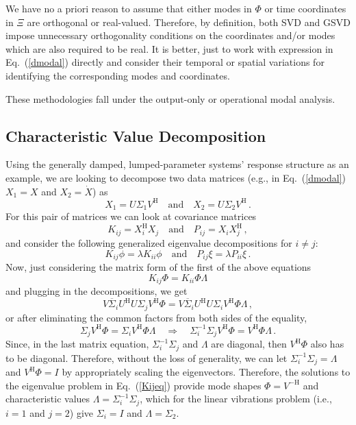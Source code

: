 \documentclass[10pt]{article}
\newcommand{\eq}[1]{Eq.\ (\ref{#1})}
\begin{document}
We have no a priori reason to assume that either modes in $\Phi$ or time coordinates in $\Xi$ are orthogonal or real-valued.
Therefore, by definition, both SVD and GSVD impose unnecessary orthogonality conditions on the coordinates and/or modes which are also required to be real.
It is better, just to work with expression in \eq{dmodal} directly and consider their temporal or spatial variations for identifying the corresponding modes and coordinates.

These methodologies fall under the output-only or operational modal analysis.

\subsection{Characteristic Value Decomposition}

Using the generally damped, lumped-parameter systems' response structure as an example, we are looking to decompose two data matrices (e.g., in \eq{dmodal} $X_1 = X$ and $X_2 = \dot X$) as 
\begin{equation}
	X_1 = U \Sigma_1 V^\mathrm{H} \quad \mathrm{and} \quad X_2 = U \Sigma_2 V^\mathrm{H}\,.
\end{equation}
For this pair of matrices we can look at covariance matrices
\begin{equation}
	K_{ij} = X_i^\mathrm{H}X_j \quad \mathrm{and} \quad P_{ij} = X_i X_j^\mathrm{H}\,,
\end{equation}
and consider the following generalized eigenvalue decompositions for $i\ne j$:
\begin{equation}
	K_{ij} \phi = \lambda K_{ii} \phi \quad \mathrm{and} \quad P_{ij} \xi = \lambda P_{ii} \xi\,.
\end{equation}
Now, just considering the matrix form of the first of the above equations
\begin{equation}\label{Kijeq}
	K_{ij} \Phi = K_{ii} \Phi\Lambda 
\end{equation}
and plugging in the decompositions, we get
\begin{equation}
	V\overline{\Sigma}_i U^\mathrm{H} U \Sigma_j V^\mathrm{H} \Phi = V\overline{\Sigma}_i U^\mathrm{H} U \Sigma_i V^\mathrm{H} \Phi \Lambda\,,
\end{equation}
or after eliminating the common factors from both sides of the equality,
\begin{equation}
	\Sigma_j V^\mathrm{H} \Phi = \Sigma_i V^\mathrm{H} \Phi \Lambda \quad \Rightarrow \quad \Sigma_i^{-1} \Sigma_j V^\mathrm{H} \Phi = V^\mathrm{H}\Phi \Lambda\,.
\end{equation}
Since, in the last matrix equation, $\Sigma_i^{-1} \Sigma_j$ and $\Lambda$ are diagonal, then $V^\mathrm{H} \Phi$ also has to be diagonal.
Therefore, without the loss of generality, we can let $\Sigma_i^{-1} \Sigma_j = \Lambda$ and $V^\mathrm{H} \Phi = I$ by appropriately scaling the eigenvectors.
Therefore, the solutions to the eigenvalue problem in \eq{Kijeq} provide mode shapes $\Phi = V^\mathrm{-H}$ and characteristic values $\Lambda = \Sigma_i^{-1} \Sigma_j$, which for the linear vibrations problem (i.e., $i =1$ and $j = 2$) give $\Sigma_i = I$ and $\Lambda = \Sigma_2$.
\end{document}

